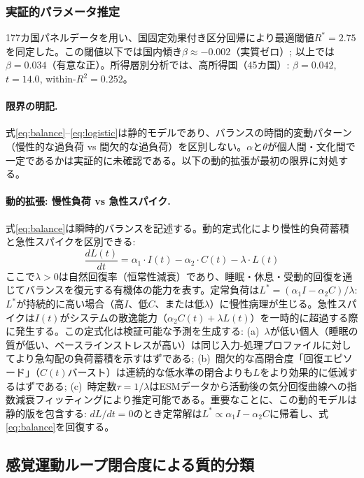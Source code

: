 \documentclass[a4paper,11pt,titlepage]{article}
\begin{document}
\subsubsection{実証的パラメータ推定}

177カ国パネルデータを用い、国固定効果付き区分回帰により最適閾値$R^* = 2.75$を同定した。この閾値以下では国内傾き$\beta \approx -0.002$（実質ゼロ）; 以上では$\beta = 0.034$（有意な正）。所得層別分析では、高所得国（45カ国）: $\beta = 0.042$, $t = 14.0$, within-$R^2 = 0.252$。

\paragraph{限界の明記.}
式\eqref{eq:balance}--\eqref{eq:logistic}は静的モデルであり、バランスの時間的変動パターン（慢性的な過負荷 vs 間欠的な過負荷）を区別しない。$\alpha$と$\theta$が個人間・文化間で一定であるかは実証的に未確認である。以下の動的拡張が最初の限界に対処する。

\paragraph{動的拡張: 慢性負荷 vs 急性スパイク.}
式\eqref{eq:balance}は瞬時的バランスを記述する。動的定式化により慢性的負荷蓄積と急性スパイクを区別できる:
\begin{equation}
\frac{dL(t)}{dt} = \alpha_1 \cdot I(t) - \alpha_2 \cdot C(t) - \lambda \cdot L(t)
\label{eq:dynamic}
\end{equation}
ここで$\lambda > 0$は自然回復率（恒常性減衰）であり、睡眠・休息・受動的回復を通じてバランスを復元する有機体の能力を表す。定常負荷は$L^* = (\alpha_1 I - \alpha_2 C)/\lambda$: $L^*$が持続的に高い場合（高$I$、低$C$、または低$\lambda$）に慢性病理が生じる。急性スパイクは$I(t)$がシステムの散逸能力（$\alpha_2 C(t) + \lambda L(t)$）を一時的に超過する際に発生する。この定式化は検証可能な予測を生成する: (a)~$\lambda$が低い個人（睡眠の質が低い、ベースラインストレスが高い）は同じ入力-処理プロファイルに対してより急勾配の負荷蓄積を示すはずである; (b)~間欠的な高閉合度「回復エピソード」（$C(t)$バースト）は連続的な低水準の閉合よりも$L$をより効果的に低減するはずである; (c)~時定数$\tau = 1/\lambda$はESMデータから活動後の気分回復曲線への指数減衰フィッティングにより推定可能である。重要なことに、この動的モデルは静的版を包含する: $dL/dt = 0$のとき定常解は$L^* \propto \alpha_1 I - \alpha_2 C$に帰着し、式\eqref{eq:balance}を回復する。


\subsection{感覚運動ループ閉合度による質的分類}\label{sec:loop-closure}
\end{document}
